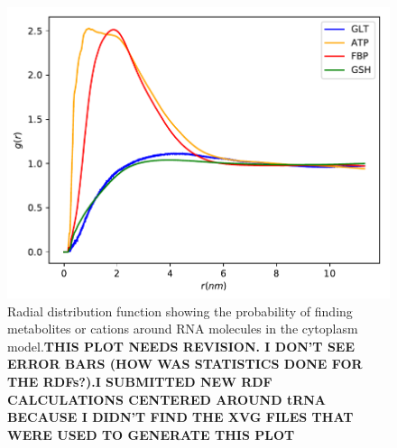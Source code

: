 \documentclass[journal=jacsat,manuscript=article]{achemso}
\begin{document}
\begin{figure}[H]
\includegraphics[scale=0.5]{rdf_RNA_metabolites.pdf}
\caption{Radial distribution function showing the probability of finding metabolites or cations around RNA molecules in the cytoplasm model.\color{red}\textbf{THIS PLOT NEEDS REVISION. I DON'T SEE ERROR BARS (HOW WAS STATISTICS DONE FOR THE RDFs?).I SUBMITTED NEW RDF CALCULATIONS CENTERED AROUND tRNA BECAUSE I DIDN'T FIND THE XVG FILES THAT WERE USED TO GENERATE THIS PLOT}}
\label{fig:tRNA_aggregation}
\end{figure}



\end{document}
